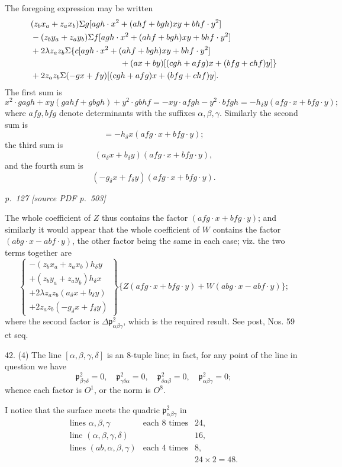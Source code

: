 \documentclass[11pt,a4paper]{article}
\newcommand{\sourcepage}[2]{%
  \bigskip
  \noindent\textit{p.~#1 [source PDF p.~#2]}%
  \par\smallskip
}
\newcommand{\p}{\mathfrak p}
\newcommand{\surf}[1]{\par\smallskip\noindent{\itshape \{Surface $#1$.\}}\par\smallskip}
\begin{document}
The foregoing expression may be written
\[
\begin{aligned}
&(z_bx_a+z_ax_b)\Sigma g[agh\cdot x^2+(ahf+bgh)xy+bhf\cdot y^2]\\
&-(z_by_a+z_ay_b)\Sigma f[agh\cdot x^2+(ahf+bgh)xy+bhf\cdot y^2]\\
&+2\lambda z_az_b\Sigma\{c[agh\cdot x^2+(ahf+bgh)xy+bhf\cdot y^2]\\
&\hspace{38mm}+(ax+by)[(cgh+afg)x+(bfg+chf)y]\}\\
&+2z_az_b\Sigma(-gx+fy)[(cgh+afg)x+(bfg+chf)y].
\end{aligned}
\]
The first sum is
\[
x^2\cdot gagh+xy(gahf+gbgh)+y^2\cdot gbhf
=-xy\cdot afgh-y^2\cdot bfgh
=-h_\delta y(afg\cdot x+bfg\cdot y);
\]
where $afg,bfg$ denote determinants with the suffixes $\alpha,\beta,\gamma$.
Similarly the second sum is
\[
=-h_\delta x(afg\cdot x+bfg\cdot y);
\]
the third sum is
\[
(a_\delta x+b_\delta y)(afg\cdot x+bfg\cdot y),
\]
and the fourth sum is
\[
(-g_\delta x+f_\delta y)(afg\cdot x+bfg\cdot y).
\]
\surf{abcd\alpha\beta}

\sourcepage{127}{503}
The whole coefficient of $Z$ thus contains the factor
$(afg\cdot x+bfg\cdot y)$; and similarly it would appear that the whole coefficient
of $W$ contains the factor $(abg\cdot x-abf\cdot y)$, the other factor being the
same in each case; viz. the two terms together are
\[
\left\{
\begin{array}{r}
-(z_bx_a+z_ax_b)h_\delta y\\
+(z_by_a+z_ay_b)h_\delta x\\
+2\lambda z_az_b(a_\delta x+b_\delta y)\\
+2z_az_b(-g_\delta x+f_\delta y)
\end{array}
\right\}
\{Z(afg\cdot x+bfg\cdot y)+W(abg\cdot x-abf\cdot y)\};
\]
where the second factor is $\Delta\p^2_{\alpha\beta\gamma}$, which is the required
result. See post, Nos. 59 et seq.

42. (4) The line $[\alpha,\beta,\gamma,\delta]$ is an 8-tuple line; in fact, for any
point of the line in question we have
\[
\p^2_{\beta\gamma\delta}=0,\quad
\p^2_{\gamma\delta\alpha}=0,\quad
\p^2_{\delta\alpha\beta}=0,\quad
\p^2_{\alpha\beta\gamma}=0;
\]
whence each factor is $O^1$, or the norm is $O^8$.

I notice that the surface meets the quadric $\p^2_{\alpha\beta\gamma}$ in
\[
\begin{array}{rcl}
\text{lines }\alpha,\beta,\gamma&\text{each 8 times}&24,\\
\text{line }(\alpha,\beta,\gamma,\delta)&&16,\\
\text{lines }(ab,\alpha,\beta,\gamma)&\text{each 4 times}&8,\\
&&24\times2=48.
\end{array}
\]
\end{document}
